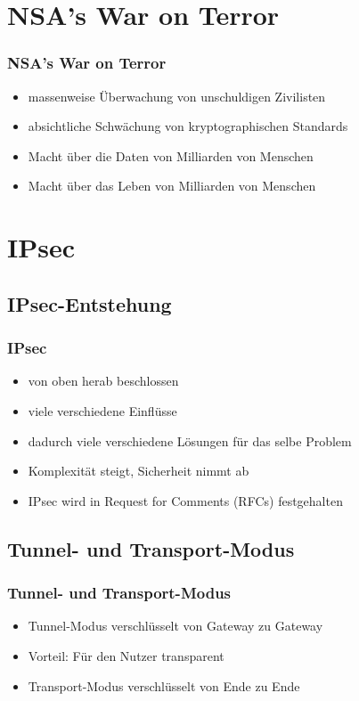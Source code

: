 \documentclass[t]{beamer}
\begin{document}
\section{NSA's War on Terror}
\begin{frame}
	\frametitle{NSA's War on Terror}
	\begin{itemize}
		\vfill
		\item massenweise Überwachung von unschuldigen Zivilisten
		\vfill
		\item absichtliche Schwächung von kryptographischen Standards
		\vfill
		\item Macht über die Daten von Milliarden von Menschen
		\vfill
		\item Macht über das Leben von Milliarden von Menschen
		\vfill
	\end{itemize}

	
\end{frame}

\section{IPsec}
\subsection*{IPsec-Entstehung}
\begin{frame}
	\frametitle{IPsec}
	\begin{itemize}
		\vfill
		\item von oben herab beschlossen
		\vfill
		\item viele verschiedene Einflüsse
		\vfill
		\item dadurch viele verschiedene Lösungen für das selbe Problem
		\vfill
		\item Komplexität steigt, Sicherheit nimmt ab
		\vfill
		\item IPsec wird in Request for Comments (RFCs) festgehalten
		\vfill
	\end{itemize}
\end{frame}

\subsection*{Tunnel- und Transport-Modus}
\begin{frame}
	\frametitle{Tunnel- und Transport-Modus}
	\begin{itemize}
		\vfill
		\item Tunnel-Modus verschlüsselt von Gateway zu Gateway
		\item Vorteil: Für den Nutzer transparent
		\vfill
		\item Transport-Modus verschlüsselt von Ende zu Ende %
		\vfill
	\end{itemize}
\end{frame}
\end{document}
